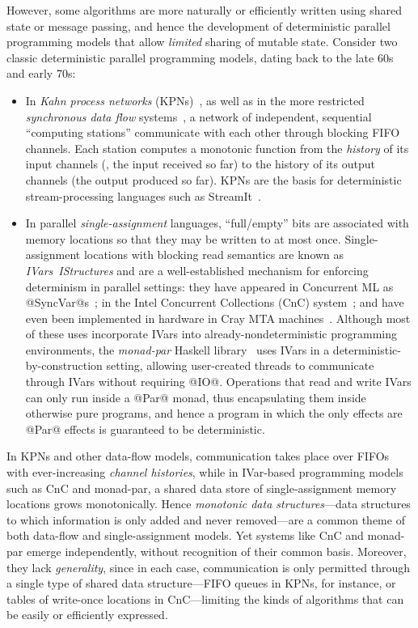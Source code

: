 \documentclass{article}
\begin{document}
However, some algorithms are more naturally or efficiently written
using shared state or message passing, and hence the development of
deterministic parallel programming models that allow \emph{limited}
sharing of mutable state.  Consider two classic deterministic parallel
programming models, dating back to the late 60s and early 70s:
\begin{itemize}
\item In \emph{Kahn process networks} (KPNs)~\cite{Kahn-1974}, as well
  as in the more restricted \emph{synchronous data flow}
  systems~\cite{lee-sdn}, a network of independent, sequential
  ``computing stations'' communicate with each other through blocking
  FIFO channels.  Each station computes a monotonic function from the
  \emph{history} of its input channels (\ie, the input received so
  far) to the history of its output channels (the output produced so
  far).  KPNs are the basis for deterministic stream-processing
  languages such as StreamIt~\cite{streamit-asplos}.
\item In parallel \emph{single-assignment} languages, ``full/empty''
  bits are associated with memory locations so that they may be
  written to at most once. Single-assignment locations with blocking
  read semantics are known as \emph{IVars}~\emph{IStructures} and are
  a well-established mechanism for enforcing determinism in parallel
  settings: they have appeared in Concurrent ML as
  @SyncVar@s~\cite{reppy-cml-book}; in the Intel Concurrent
  Collections (CnC) system~\cite{CnC}; and have even been implemented
  in hardware in Cray MTA machines~\cite{cray-mta}.  Although most of
  these uses incorporate IVars into already-nondeterministic
  programming environments, the \emph{monad-par} Haskell
  library~\cite{monad-par} uses IVars in a
  deterministic-by-construction setting, allowing user-created threads
  to communicate through IVars without requiring @IO@.  Operations
  that read and write IVars can only run inside a @Par@ monad, thus
  encapsulating them inside otherwise pure programs, and hence a
  program in which the only effects are @Par@ effects is guaranteed to
  be deterministic.
\end{itemize}
In KPNs and other data-flow models, communication takes place over
FIFOs with ever-increasing \emph{channel histories}, while in
IVar-based programming models such as CnC and monad-par, a shared data
store of single-assignment memory locations grows monotonically.
Hence \emph{monotonic data structures}---data structures to which
information is only added and never removed---are a common theme of
both data-flow and single-assignment models.  Yet systems like CnC and
monad-par emerge independently, without recognition of their common
basis.  Moreover, they lack \emph{generality}, since in each case,
communication is only permitted through a single type of shared data
structure---FIFO queues in KPNs, for instance, or tables of write-once
locations in CnC---limiting the kinds of algorithms that can be easily
or efficiently expressed.
\end{document}
